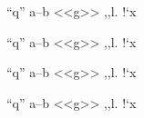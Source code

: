 \documentclass{article}
\begin{document}
{\selectfont ``q'' a--b <<g>> ,,l. !`x}

{\selectfont ``q'' a--b <<g>> ,,l. !`x}

{\selectfont ``q'' a--b <<g>> ,,l. !`x}

{\selectfont ``q'' a--b <<g>> ,,l. !`x}
\end{document}
